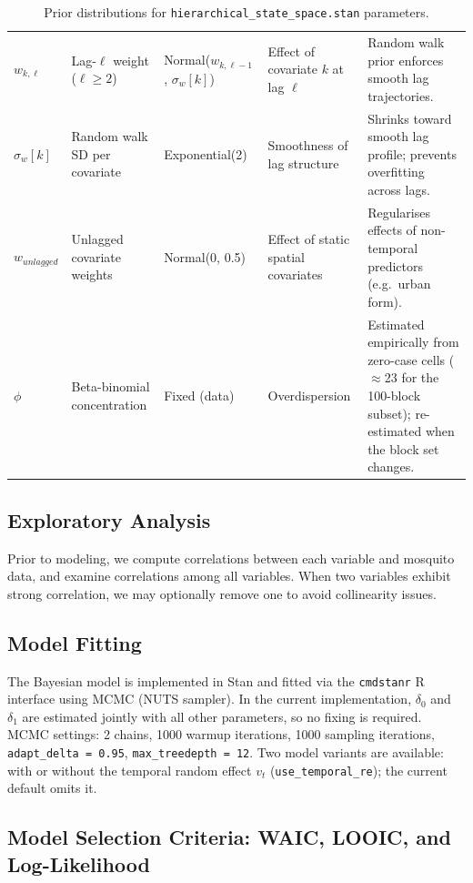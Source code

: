 \documentclass[12pt,a4paper]{article}
\begin{document}
\begin{table}[ht]
\begin{tabular}{p{2.0cm}p{3.0cm}p{3.0cm}p{3.0cm}p{4.5cm}}
\addlinespace
\textbf{$w_{k,\ell}$} & Lag-$\ell$ weight ($\ell \geq 2$) & Normal($w_{k,\ell-1}$, $\sigma_w[k]$) & Effect of covariate $k$ at lag $\ell$ & Random walk prior enforces smooth lag trajectories. \\
\addlinespace
\textbf{$\sigma_w[k]$} & Random walk SD per covariate & Exponential(2) & Smoothness of lag structure & Shrinks toward smooth lag profile; prevents overfitting across lags. \\
\addlinespace
\textbf{$w_{unlagged}$} & Unlagged covariate weights & Normal(0, 0.5) & Effect of static spatial covariates & Regularises effects of non-temporal predictors (e.g.\ urban form). \\
\addlinespace
\textbf{$\phi$} & Beta-binomial concentration & Fixed (data) & Overdispersion & Estimated empirically from zero-case cells ($\approx$23 for the 100-block subset); re-estimated when the block set changes. \\
\bottomrule
\end{tabular}
\caption{Prior distributions for \texttt{hierarchical\_state\_space.stan} parameters.}
\label{tab:priors}
\end{table}


\subsection{Exploratory Analysis}

Prior to modeling, we compute correlations between each variable and mosquito data, and examine correlations among all variables. When two variables exhibit strong correlation, we may optionally remove one to avoid collinearity issues.

\subsection{Model Fitting}

The Bayesian model is implemented in Stan and fitted via the \texttt{cmdstanr} R interface using MCMC (NUTS sampler). In the current implementation, $\delta_0$ and $\delta_1$ are estimated jointly with all other parameters, so no fixing is required. MCMC settings: 2 chains, 1000 warmup iterations, 1000 sampling iterations, \texttt{adapt\_delta = 0.95}, \texttt{max\_treedepth = 12}. Two model variants are available: with or without the temporal random effect $v_t$ (\texttt{use\_temporal\_re}); the current default omits it.

\subsection{Model Selection Criteria: WAIC, LOOIC, and Log-Likelihood}
\end{document}
